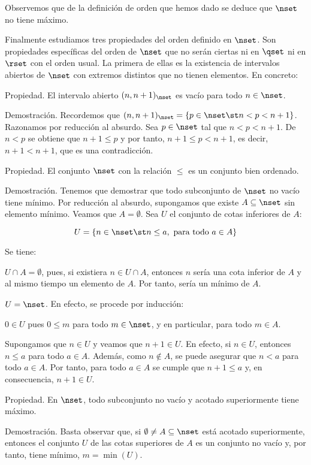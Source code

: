 
Observemos que de la definición de orden que hemos dado se deduce que
$\nset$ no tiene máximo.

Finalmente estudiamos tres propiedades del orden definido en $\nset$. Son
propiedades específicas del orden de $\nset$ que no serán ciertas ni en
$\qset$ ni en $\rset$ con el orden usual. La primera de ellas es la
existencia de intervalos abiertos de $\nset$ con extremos distintos que no
tienen elementos. En concreto:

Propiedad. El intervalo abierto $(n, n + 1)_{\nset}$ es vacío para todo $n
\in \nset$.

Demostración. Recordemos que $(n, n + 1)_{\nset} = \{ p \in \nset \st n < p
< n + 1 \}$. Razonamos por reducción al absurdo. Sea $p \in \nset$ tal que
$n < p < n + 1$. De $n < p$ se obtiene que $n + 1 \leq p$ y por tanto, $n +
1 \leq p < n + 1$, es decir, $n + 1 < n + 1$, que es una contradicción.

Propiedad. El conjunto $\nset$ con la relación $\leq$ es un conjunto bien
ordenado.

Demostración. Tenemos que demostrar que todo subconjunto de $\nset$ no vacío
tiene mínimo. Por reducción al absurdo, supongamos que existe $A \subseteq
\nset$ sin elemento mínimo. Veamos que $A = \emptyset$. Sea $U$ el conjunto
de cotas inferiores de $A$:

$$ U = \{ n \in \nset \st n \leq a, \ \text{para todo} \ a \in A \} $$

Se tiene:

$U \cap A = \emptyset$, pues, si existiera $n \in U \cap A$, entonces $n$
sería una cota inferior de $A$ y al mismo tiempo un elemento de $A$. Por
tanto, sería un mínimo de $A$.

$U = \nset$. En efecto, se procede por inducción:

$0 \in U$ pues $0 \leq m$ para todo $m \in \nset$, y en particular, para
todo $m \in A$.

Supongamos que $n \in U$ y veamos que $n + 1 \in U$. En efecto, si $n \in
U$, entonces $n \leq a$ para todo $a \in A$. Además, como $n \notin A$, se
puede asegurar que $n < a$ para todo $a \in A$. Por tanto, para todo $a \in
A$ se cumple que $n + 1 \leq a$ y, en consecuencia, $n + 1 \in U$.

Propiedad. En $\nset$, todo subconjunto no vacío y acotado superiormente
tiene máximo.

Demostración. Basta observar que, si $\emptyset \neq A \subseteq \nset$ está
acotado superiormente, entonces el conjunto $U$ de las cotas superiores de
$A$ es un conjunto no vacío y, por tanto, tiene mínimo, $m = \min(U)$.

